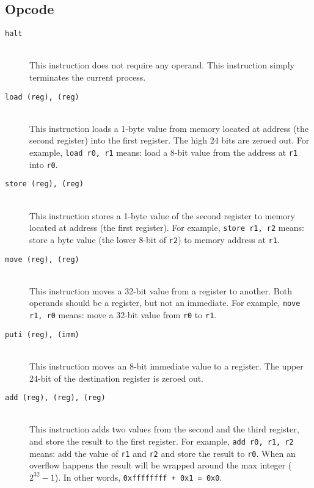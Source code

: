 \documentclass[a4paper, 11pt]{article}
\theoremstyle{definition}
\begin{document}
{\subsection{Opcode}

\begin{description}

  \item [\texttt{halt}]~\\
    This instruction does not require any operand. This instruction
    simply terminates the current process.

  \item [\texttt{load (reg), (reg)}]~\\
    This instruction loads a 1-byte value from memory located at
    address (the second register) into the first register. The high 24
    bits are zeroed out. For example, \texttt{load r0, r1} means: load
    a 8-bit value from the address at \texttt{r1} into \texttt{r0}.

  \item [\texttt{store (reg), (reg)}]~\\
    This instruction stores a 1-byte value of the second register to
    memory located at address (the first register). For example,
    \texttt{store r1, r2} means: store a byte value (the lower 8-bit
    of \texttt{r2}) to memory address at \texttt{r1}.

  \item [\texttt{move (reg), (reg)}]~\\
    This instruction moves a 32-bit value from a register to another.
    Both operands should be a register, but not an immediate. For
    example, \texttt{move r1, r0} means: move a 32-bit value from
    \texttt{r0} to \texttt{r1}.

  \item [\texttt{puti (reg), (imm)}]~\\
    This instruction moves an 8-bit immediate value to a register. The
    upper 24-bit of the destination register is zeroed out.

  \item [\texttt{add (reg), (reg), (reg)}]~\\
    This instruction adds two values from the second and the third
    register, and store the result to the first register. For example,
    \texttt{add r0, r1, r2} means: add the value of \texttt{r1} and
    \texttt{r2} and store the result to \texttt{r0}. When an overflow
    happens the result will be wrapped around the max integer
    ($2^{32}-1$). In other words, \texttt{0xffffffff + 0x1 = 0x0}.


\end{description}}
\end{document}
